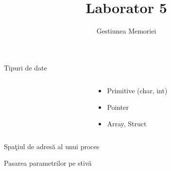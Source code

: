 \documentclass{so.cs.pub.ro}
\title[Laborator 5]{Laborator 5}
\subtitle{Gestiunea Memoriei}
\begin{document}
\frame{\titlepage}

\begin{frame}{Tipuri de date}
\begin{columns}
\begin{column}[1]{0.55\textwidth}
\end{column}
\begin{column}[1]{0.4\textwidth}
      \begin{itemize}
        \item Primitive (char, int)
        \item Pointer 
        \item Array, Struct 
      \end{itemize}
\end{column}
\end{columns}
\end{frame}

\begin{frame}{Spaţiul de adresă al unui proces}
\end{frame}

\begin{frame}{Pasarea parametrilor pe stivă}
\end{frame}
\end{document}
